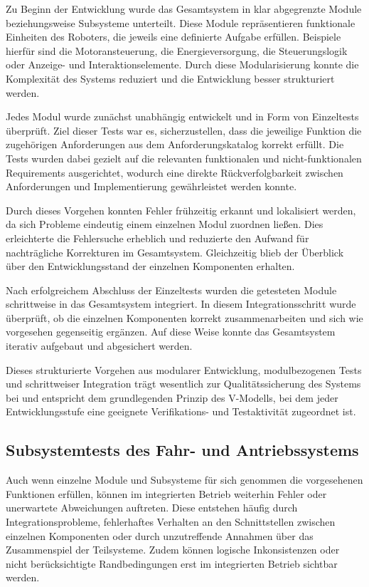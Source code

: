 Zu Beginn der Entwicklung wurde das Gesamtsystem in klar abgegrenzte Module beziehungsweise Subsysteme unterteilt. Diese Module repräsentieren funktionale Einheiten des Roboters, die jeweils eine definierte Aufgabe erfüllen. Beispiele hierfür sind die Motoransteuerung, die Energieversorgung, die Steuerungslogik oder Anzeige- und Interaktionselemente. Durch diese Modularisierung konnte die Komplexität des Systems reduziert und die Entwicklung besser strukturiert werden.

Jedes Modul wurde zunächst unabhängig entwickelt und in Form von Einzeltests überprüft. Ziel dieser Tests war es, sicherzustellen, dass die jeweilige Funktion die zugehörigen Anforderungen aus dem Anforderungskatalog korrekt erfüllt. Die Tests wurden dabei gezielt auf die relevanten funktionalen und nicht-funktionalen Requirements ausgerichtet, wodurch eine direkte Rückverfolgbarkeit zwischen Anforderungen und Implementierung gewährleistet werden konnte.

Durch dieses Vorgehen konnten Fehler frühzeitig erkannt und lokalisiert werden, da sich Probleme eindeutig einem einzelnen Modul zuordnen ließen. Dies erleichterte die Fehlersuche erheblich und reduzierte den Aufwand für nachträgliche Korrekturen im Gesamtsystem. Gleichzeitig blieb der Überblick über den Entwicklungsstand der einzelnen Komponenten erhalten.

Nach erfolgreichem Abschluss der Einzeltests wurden die getesteten Module schrittweise in das Gesamtsystem integriert. In diesem Integrationsschritt wurde überprüft, ob die einzelnen Komponenten korrekt zusammenarbeiten und sich wie vorgesehen gegenseitig ergänzen. Auf diese Weise konnte das Gesamtsystem iterativ aufgebaut und abgesichert werden.

Dieses strukturierte Vorgehen aus modularer Entwicklung, modulbezogenen Tests und schrittweiser Integration trägt wesentlich zur Qualitätssicherung des Systems bei und entspricht dem grundlegenden Prinzip des V-Modells, bei dem jeder Entwicklungsstufe eine geeignete Verifikations- und Testaktivität zugeordnet ist.

\subsection{Subsystemtests des Fahr- und Antriebssystems}
\label{cha:Subsystemtests des Fahr- und Antriebssystems}

Auch wenn einzelne Module und Subsysteme für sich genommen die vorgesehenen Funktionen erfüllen, können im integrierten Betrieb weiterhin Fehler oder unerwartete Abweichungen auftreten. Diese entstehen häufig durch Integrationsprobleme, fehlerhaftes Verhalten an den Schnittstellen zwischen einzelnen Komponenten oder durch unzutreffende Annahmen über das Zusammenspiel der Teilsysteme. Zudem können logische Inkonsistenzen oder nicht berücksichtigte Randbedingungen erst im integrierten Betrieb sichtbar werden.

